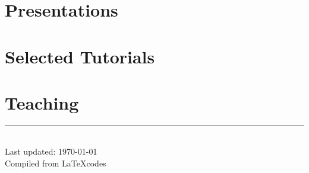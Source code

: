 \documentclass[11pt]{article} %
\begin{document}

\section*{Presentations}
\label{presentations}






\section*{Selected Tutorials}
\label{tutorials}



\section*{Teaching}
\label{teaching}



% 


% 


% 


\centering
\rule{0.25\linewidth}{0.4pt}\\
\medskip
Last updated: \today\\
Compiled from \LaTeX codes
\end{document}
